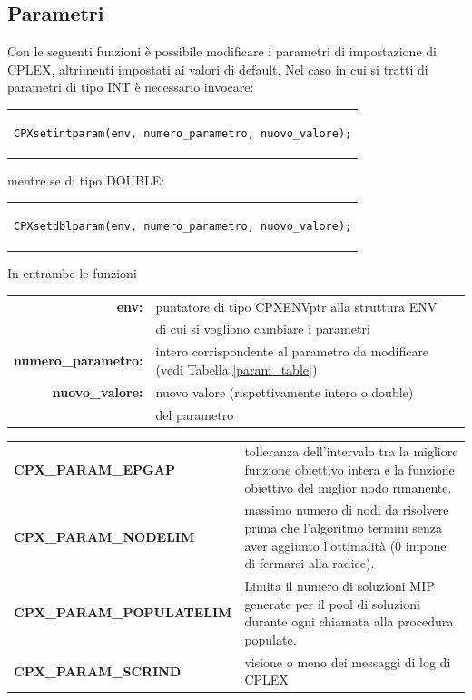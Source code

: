 \subsection{Parametri}\label{param}
Con le seguenti funzioni è possibile modificare i parametri di impostazione di CPLEX, altrimenti impostati ai valori di default.
Nel caso in cui si tratti di parametri di tipo INT è necessario invocare:\\
\begin{center}
\begin{tabular}{c}
\begin{lstlisting}[linewidth=330pt, basicstyle=\footnotesize\sffamily,]     
CPXsetintparam(env, numero_parametro, nuovo_valore);
\end{lstlisting}
\end{tabular}
\end{center}
mentre se di tipo DOUBLE:\\
\begin{center}
\begin{tabular}{c}
\begin{lstlisting}[linewidth=330pt, basicstyle=\footnotesize\sffamily,]     
CPXsetdblparam(env, numero_parametro, nuovo_valore);
\end{lstlisting}
\end{tabular}
\end{center}
In entrambe le funzioni
\begin{table}[h]
\begin{tabular}{rl}
\textbf{env:} & {puntatore di tipo CPXENVptr alla struttura ENV}\\
& {di cui si vogliono cambiare i parametri}\\
\textbf{numero\_parametro:} & {intero corrispondente al parametro da modificare (vedi Tabella \ref{param_table})}\\
\textbf{nuovo\_valore:} & {nuovo valore (rispettivamente intero o double)}\\
& {del parametro}\\
\end{tabular}
\end{table}

\begin{table}[h]
\centering
\begin{tabular}{|l|l|}
\hline
{\textbf{CPX\_PARAM\_EPGAP}} & {tolleranza dell'intervalo tra la migliore funzione obiettivo intera e la funzione obiettivo del miglior nodo rimanente.}\\
{\textbf{CPX\_PARAM\_NODELIM}} & {massimo numero di nodi da risolvere prima che l'algoritmo termini senza aver aggiunto l'ottimalità (0 impone di fermarsi alla radice).}\\
{\textbf{CPX\_PARAM\_POPULATELIM}} & {Limita il numero di soluzioni MIP generate per il pool di soluzioni durante ogni chiamata alla procedura populate.}\\
{\textbf{CPX\_PARAM\_SCRIND}} & {visione o meno dei messaggi di log di CPLEX}\\
\hline
\end{tabular}
\end{table}
